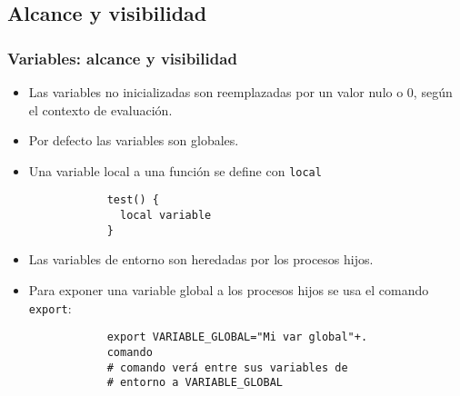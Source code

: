 \subsection{Alcance y visibilidad}
\begin{frame}[fragile]
	\frametitle{Variables: alcance y visibilidad}
	\begin{itemize}
		\item Las variables no inicializadas son reemplazadas por un valor nulo o 0, según el contexto de evaluación.
		\item Por defecto las variables son globales.
		\item Una variable local a una función se define con \texttt{local}
		\begin{lstlisting}
			test() {
			  local variable
			}
		\end{lstlisting}
		\item Las variables de entorno son heredadas por los procesos hijos.
		\item Para exponer una variable global a los procesos hijos se usa
          el comando \texttt{export}:
		\begin{lstlisting}
			export VARIABLE_GLOBAL="Mi var global"+.
			comando
			# comando verá entre sus variables de
			# entorno a VARIABLE_GLOBAL
		\end{lstlisting}
	\end{itemize}
\end{frame}


